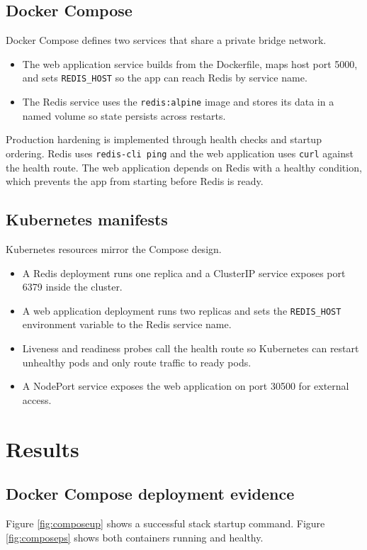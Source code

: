 \subsection{Docker Compose}
Docker Compose defines two services that share a private bridge network.

\begin{itemize}
  \item The web application service builds from the Dockerfile, maps host port 5000, and sets \texttt{REDIS\_HOST} so the app can reach Redis by service name.
  \item The Redis service uses the \texttt{redis:alpine} image and stores its data in a named volume so state persists across restarts.
\end{itemize}

Production hardening is implemented through health checks and startup ordering. Redis uses \texttt{redis-cli ping} and the web application uses \texttt{curl} against the health route. The web application depends on Redis with a healthy condition, which prevents the app from starting before Redis is ready.

\subsection{Kubernetes manifests}
Kubernetes resources mirror the Compose design.

\begin{itemize}
  \item A Redis deployment runs one replica and a ClusterIP service exposes port 6379 inside the cluster.
  \item A web application deployment runs two replicas and sets the \texttt{REDIS\_HOST} environment variable to the Redis service name.
  \item Liveness and readiness probes call the health route so Kubernetes can restart unhealthy pods and only route traffic to ready pods.
  \item A NodePort service exposes the web application on port 30500 for external access.
\end{itemize}

\section{Results}

\subsection{Docker Compose deployment evidence}
Figure \ref{fig:composeup} shows a successful stack startup command. Figure \ref{fig:composeps} shows both containers running and healthy.

